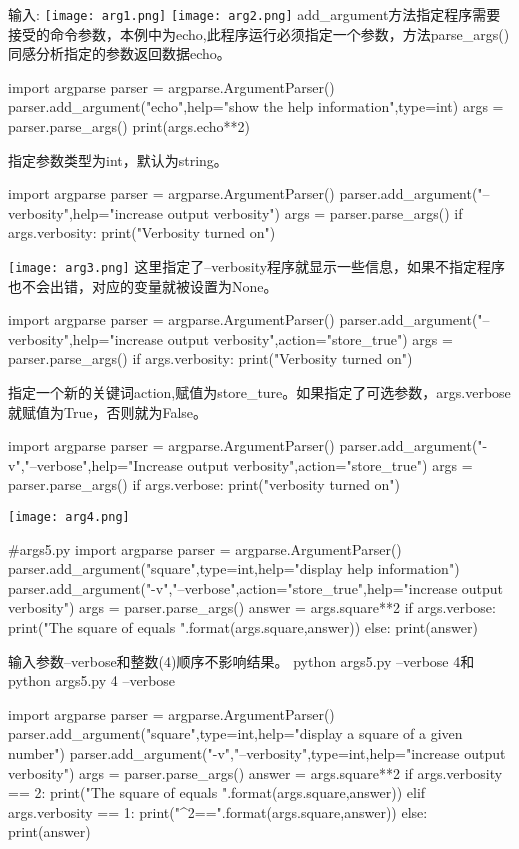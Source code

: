 输入:\newline
\texttt{[image: arg1.png]}\newline
\texttt{[image: arg2.png]}\newline
add\_argument方法指定程序需要接受的命令参数，本例中为echo,此程序运行必须指定一个参数，方法parse\_args()同感分析指定的参数返回数据echo。
\begin{python}
import argparse
parser = argparse.ArgumentParser()
parser.add_argument("echo",help="show the help information",type=int)
args = parser.parse_args()
print(args.echo**2)
\end{python}
指定参数类型为int，默认为string。
\begin{python}
import argparse
parser = argparse.ArgumentParser()
parser.add_argument("--verbosity",help="increase output verbosity")
args = parser.parse_args()
if args.verbosity:
    print("Verbosity turned on")
\end{python}
\texttt{[image: arg3.png]}\newline
这里指定了--verbosity程序就显示一些信息，如果不指定程序也不会出错，对应的变量就被设置为None。
\begin{python}
import argparse
parser = argparse.ArgumentParser()
parser.add_argument("--verbosity",help="increase output verbosity",action="store_true")
args = parser.parse_args()
if args.verbosity:
    print("Verbosity turned on")
\end{python}
指定一个新的关键词action,赋值为store\_ture。如果指定了可选参数，args.verbose就赋值为True，否则就为False。
\begin{python}
import argparse
parser = argparse.ArgumentParser()
parser.add_argument("-v","--verbose",help="Increase output verbosity",action="store_true")
args = parser.parse_args()
if args.verbose:
    print("verbosity turned on")
\end{python}
\texttt{[image: arg4.png]}\newline
\begin{python}
#args5.py
import argparse
parser = argparse.ArgumentParser()
parser.add_argument("square",type=int,help="display help information")
parser.add_argument("-v","--verbose",action="store_true",help="increase output verbosity")
args = parser.parse_args()
answer = args.square**2
if args.verbose:
    print("The square of {} equals {}".format(args.square,answer))
else:
    print(answer)
\end{python}
输入参数--verbose和整数(4)顺序不影响结果。
python args5.py --verbose 4和python args5.py 4 --verbose
\begin{python}
import argparse
parser = argparse.ArgumentParser()
parser.add_argument("square",type=int,help="display a square of a given number")
parser.add_argument("-v","--verbosity",type=int,help="increase output verbosity")
args = parser.parse_args()
answer = args.square**2
if args.verbosity == 2:
    print("The square of {} equals {}".format(args.square,answer))
elif args.verbosity == 1:
    print("{}^2=={}".format(args.square,answer))
else:
    print(answer)
\end{python}
